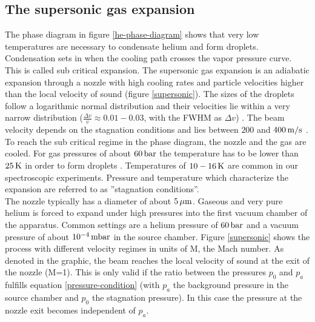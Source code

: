 \documentclass[parskip,12pt,headsepline,a4paper] {scrbook}
\begin{document}
\subsection{The supersonic gas expansion}
\vspace{-1\baselineskip}
The phase diagram in figure \ref{he-phase-diagram} shows that very low temperatures are necessary to condensate helium and form droplets. Condensation sets in when the cooling path crosses the vapor pressure curve. This is called sub critical expansion. The supersonic gas expansion is an adiabatic expansion through a nozzle with high cooling rates and particle velocities higher than the local velocity of sound (figure \ref{supersonic}). The sizes of the droplets follow a logarithmic normal distribution and their velocities lie within a very narrow distribution ($\frac{\Delta v}{v} \approx 0.01-0.03$, with the FWHM as $\Delta v$) \cite{scoles} \cite{scoles2}. The beam velocity depends on the stagnation conditions and lies between $200$ and $\unit[400]{m/s}$ \cite{toennis}.\\
To reach the sub critical regime in the phase diagram, the nozzle and the gas are cooled. For gas pressures of about $\unit[60]{bar}$ the temperature has to be lower than $\unit[25]{K}$ in order to form droplets \cite{nanolab}. Temperatures of $\unit[10-16]{K}$ are common in our spectroscopic experiments. Pressure and temperature which characterize the expansion are referred to as ''stagnation conditions''. \\
The nozzle typically has a diameter of about $\unit[5]{\mu m}$. Gaseous and very pure helium is forced to expand under high pressures into the first vacuum chamber of the apparatus. Common settings are a helium pressure of $\unit[60]{bar}$ and a vacuum pressure of about $\unit[10^{-4}]{mbar}$ in the source chamber. Figure \ref{supersonic} shows the process with different velocity regimes in units of M, the Mach number. As denoted in the graphic, the beam reaches the local velocity of sound at the exit of the nozzle (M=1). This is only valid if the ratio between the pressures $p_0$ and $p_a$ fulfills equation \ref{pressure-condition} (with $p_a$ the background pressure in the source chamber and $p_0$ the stagnation pressure). In this case the pressure at the nozzle exit becomes independent of $p_a$.
\end{document}
